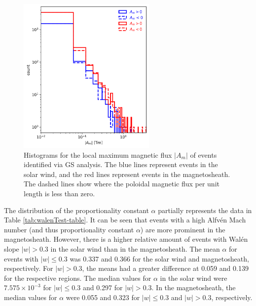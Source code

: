 \begin{figure}
    \centering
    \includegraphics[width=0.6\textwidth]{Figures/Histograms/histogram_Asplit.png}
    \caption{Histograms for the local maximum magnetic flux $|A_m|$ of events identified via GS analysis. The blue lines represent events in the solar wind, and the red lines represent events in the magnetosheath. The dashed lines show where the poloidal magnetic flux per unit length is less than zero.}
    \label{fig:histogram-Asplit}
\end{figure}

The distribution of the proportionality constant $\alpha$ partially represents the data in Table \ref{tab:walenTest-table}. It can be seen that events with a high Alfv\'en Mach number (and thus proportionality constant $\alpha$) are more prominent in the magnetosheath. However, there is a higher relative amount of events with Wal\'en slope $|w|>0.3$ in the solar wind than in the magnetosheath. The mean $\alpha$ for events with $|w|\leq 0.3$ was 0.337 and 0.366 for the solar wind and magnetosheath, respectively. For $|w|>0.3$, the means had a greater difference at 0.059 and 0.139 for the respective regions. The median values for $\alpha$ in the solar wind were $7.575\times 10^{-3}$ for $|w|\leq 0.3$ and 0.297 for $|w|>0.3$. In the magnetosheath, the median values for $\alpha$ were 0.055 and 0.323 for $|w|\leq 0.3$ and $|w|>0.3$, respectively.

